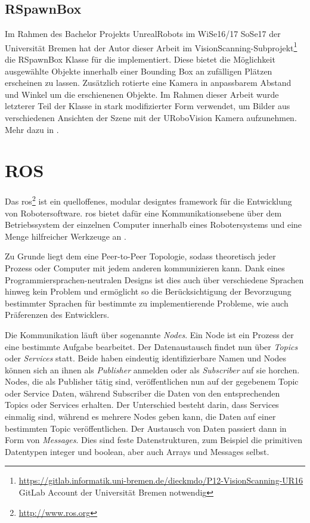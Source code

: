 \subsection{RSpawnBox}
\label{sec:rspawnbox}

Im Rahmen des Bachelor Projekts UnrealRobots im WiSe16/17 SoSe17 der Universität Bremen hat der Autor dieser Arbeit im VisionScanning-Subprojekt\footnote{\url{https://gitlab.informatik.uni-bremen.de/dieckmdo/P12-VisionScanning-UR16} GitLab Account der Universität Bremen notwendig} die RSpawnBox Klasse für die \unreal implementiert. Diese bietet die Möglichkeit ausgewählte Objekte innerhalb einer Bounding Box an zufälligen Plätzen erscheinen zu lassen. Zusätzlich rotierte eine Kamera in anpassbarem Abstand und Winkel um die erschienenen Objekte. Im Rahmen dieser Arbeit wurde letzterer Teil der Klasse in stark modifizierter Form verwendet, um Bilder aus verschiedenen Ansichten der Szene mit der URoboVision Kamera aufzunehmen. Mehr dazu in .         

\section{ROS}
\label{sec:ros}
Das \acrfull{ros}\footnote{\url{http://www.ros.org}} ist ein quelloffenes, modular designtes \gls{framework} für die Entwicklung von Robotersoftware. \gls{ros} bietet dafür eine Kommunikationsebene über dem Betriebssystem der einzelnen Computer innerhalb eines Robotersystems und eine Menge hilfreicher Werkzeuge an \cite{ros}.\par 

Zu Grunde liegt dem eine Peer-to-Peer Topologie, sodass theoretisch jeder Prozess oder Computer mit jedem anderen kommunizieren kann. Dank eines Programmiersprachen-neutralen Designs ist dies auch über verschiedene Sprachen hinweg kein Problem und ermöglicht so die Berücksichtigung der Bevorzugung bestimmter Sprachen für bestimmte zu implementierende Probleme, wie auch Präferenzen des Entwicklers.\par

Die Kommunikation läuft über sogenannte \textit{Nodes}. Ein Node ist ein Prozess der eine bestimmte Aufgabe bearbeitet. Der Datenaustausch findet nun über \textit{Topics} oder \textit{Services} statt. Beide haben eindeutig identifizierbare Namen und Nodes können sich an ihnen als \textit{Publisher} anmelden oder als \textit{Subscriber} auf sie horchen. Nodes, die als Publisher tätig sind, veröffentlichen nun auf der gegebenem Topic oder Service Daten, während Subscriber die Daten von den entsprechenden Topics oder Services erhalten. Der Unterschied besteht darin, dass Services einmalig sind, während es mehrere Nodes geben kann, die Daten auf einer bestimmten Topic veröffentlichen. Der Austausch von Daten passiert dann in Form von \textit{Messages}. Dies sind feste Datenstrukturen, zum Beispiel die primitiven Datentypen integer und boolean, aber auch Arrays und Messages selbst. \par

